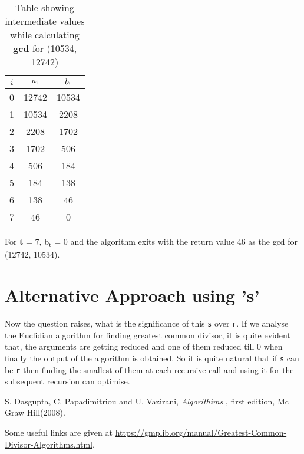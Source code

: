\documentclass[12pt]{article}
\begin{document}
\begin{table}[h!]
\centering
	\begin{tabular}{c | c | c}
		\hline
		$i$ & $a\textsubscript{i}$ & $b\textsubscript{i}$ \\ [0.5ex] 
		\hline
		0 & 12742 & 10534 \\ 
		1 & 10534 & 2208 \\  
		2 & 2208  & 1702 \\
		3 & 1702  & 506 \\
		4 & 506   & 184 \\
		5 & 184   & 138 \\
		6 & 138   & 46 \\
		7 & 46    & 0
	\end{tabular}
\caption{Table showing intermediate values while calculating \textbf{gcd} for (10534, 12742)}
\label{table:2}
\end{table}

For \textbf{t} = 7, b\textsubscript{t} = 0 and the algorithm exits with the return value 
46 as the gcd for (12742, 10534).

\section{Alternative Approach using 's'}
Now the question raises, what is the significance of this \texttt{s} over \texttt{r}.
If we analyse the Euclidian algorithm for finding greatest common divisor, it is quite evident that, the arguments are getting reduced and one of them reduced till 0 when finally the output of the algorithm is obtained. So it is quite natural that if \texttt{s} can be \texttt{r} then finding the smallest of them at each recursive call and using it for the subsequent recursion can optimise. 

\begin{thebibliography}{6}

S. Dasgupta, C. Papadimitriou and U. Vazirani, \textsl{Algorithims
},
first edition, Mc Graw Hill(2008).

Some useful links are given at \url{https://gmplib.org/manual/Greatest-Common-Divisor-Algorithms.html}.

\end{thebibliography}
\end{document}
